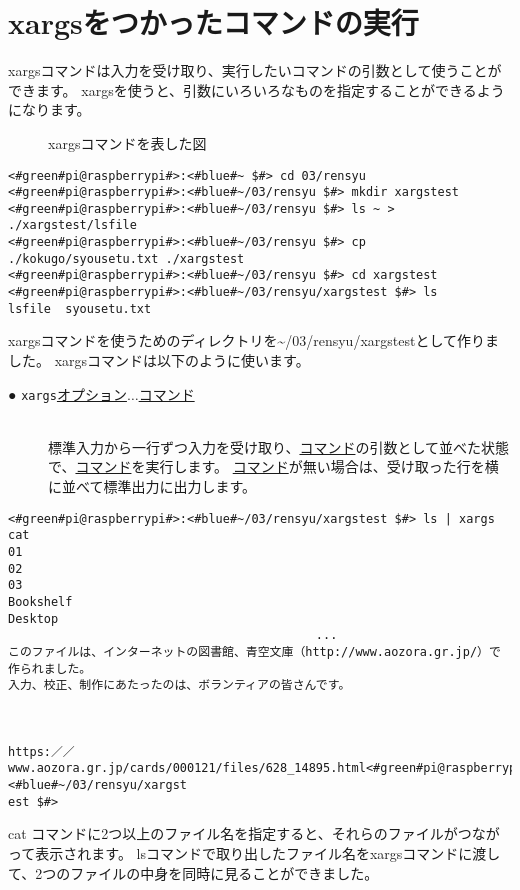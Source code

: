 \newpage
\section{xargsをつかったコマンドの実行}
xargsコマンドは入力を受け取り、実行したいコマンドの引数として使うことができます。
xargsを使うと、引数にいろいろなものを指定することができるようになります。
\begin{figure}[h]
    \centering
    
    \caption{xargsコマンドを表した図}
    \label{ch03:xargs_command}
\end{figure}
\begin{lstlisting}[caption=xargsコマンドを使う準備をする]
<#green#pi@raspberrypi#>:<#blue#~ $#> cd 03/rensyu
<#green#pi@raspberrypi#>:<#blue#~/03/rensyu $#> mkdir xargstest
<#green#pi@raspberrypi#>:<#blue#~/03/rensyu $#> ls ~ > ./xargstest/lsfile
<#green#pi@raspberrypi#>:<#blue#~/03/rensyu $#> cp ./kokugo/syousetu.txt ./xargstest
<#green#pi@raspberrypi#>:<#blue#~/03/rensyu $#> cd xargstest
<#green#pi@raspberrypi#>:<#blue#~/03/rensyu/xargstest $#> ls
lsfile  syousetu.txt
\end{lstlisting}
xargsコマンドを使うためのディレクトリを\textasciitilde /03/rensyu/xargstestとして作りました。
xargsコマンドは以下のように使います。

\begin{description}
    \item[● \texttt{xargs}\textvisiblespace \underline{オプション}$\ldots$\textvisiblespace \underline{コマンド}]\mbox{}\\
    標準入力から一行ずつ入力を受け取り、\underline{コマンド}の引数として並べた状態で、\underline{コマンド}を実行します。
    \underline{コマンド}が無い場合は、受け取った行を横に並べて標準出力に出力します。
\end{description}

\newpage
\begin{lstlisting}[caption=xargsコマンドを使ってcatコマンドを使う]
<#green#pi@raspberrypi#>:<#blue#~/03/rensyu/xargstest $#> ls | xargs cat
01
02
03
Bookshelf
Desktop
                                           ...
このファイルは、インターネットの図書館、青空文庫（http://www.aozora.gr.jp/）で作られました。
入力、校正、制作にあたったのは、ボランティアの皆さんです。



https:／／www.aozora.gr.jp/cards/000121/files/628_14895.html<#green#pi@raspberrypi#>:<#blue#~/03/rensyu/xargst
est $#>
\end{lstlisting}
cat コマンドに2つ以上のファイル名を指定すると、それらのファイルがつながって表示されます。
lsコマンドで取り出したファイル名をxargsコマンドに渡して、2つのファイルの中身を同時に見ることができました。

